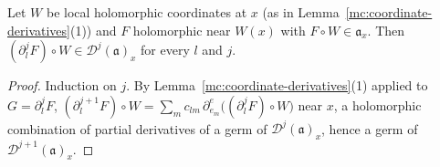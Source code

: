 \begin{lemma}
\label{mc:coordinate-iterated}
\leanok
Let \(W\) be local holomorphic coordinates at \(x\) (as in Lemma~\ref{mc:coordinate-derivatives}(1)) and \(F\) holomorphic near \(W(x)\) with
\(F\circ W\in\mathfrak a_x\). Then \((\partial_l^jF)\circ W\in\mathcal D^j(\mathfrak a)_x\) for every \(l\) and \(j\).
\end{lemma}
\begin{proof}
\leanok
Induction on \(j\). By Lemma~\ref{mc:coordinate-derivatives}(1) applied to \(G=\partial_l^jF\),
\((\partial_l^{j+1}F)\circ W=\sum_mc_{lm}\,\partial^{e}_{e_m}\bigl((\partial_l^jF)\circ W\bigr)\) near \(x\), a holomorphic combination of partial derivatives of
a germ of \(\mathcal D^j(\mathfrak a)_x\), hence a germ of \(\mathcal D^{j+1}(\mathfrak a)_x\).
\end{proof}

